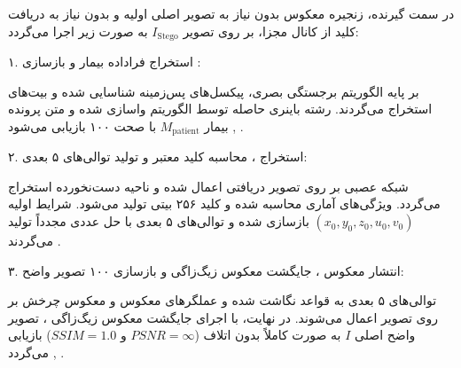 




در سمت گیرنده، زنجیره معکوس بدون نیاز به تصویر اصلی اولیه و بدون نیاز به دریافت کلید از کانال مجزا، بر روی تصویر $I_{\mathrm{Stego}}$ به صورت زیر اجرا می‌گردد:\par



۱. استخراج فراداده بیمار و بازسازی :\par

بر پایه الگوریتم برجستگی بصری، پیکسل‌های پس‌زمینه شناسایی شده و بیت‌های  استخراج می‌گردند. رشته باینری حاصله توسط الگوریتم  واسازی  شده و متن پرونده بیمار $M_{\mathrm{patient}}$ با صحت ۱۰۰ بازیابی می‌شود , .\par



۲. استخراج ، محاسبه کلید معتبر و تولید توالی‌های ۵ بعدی:\par

شبکه عصبی  بر روی تصویر دریافتی اعمال شده و ناحیه دست‌نخورده  استخراج می‌گردد. ویژگی‌های آماری  محاسبه شده و کلید ۲۵۶ بیتی  تولید می‌شود. شرایط اولیه $(x_0,\allowbreak{} y_0,\allowbreak{} z_0,\allowbreak{} u_0,\allowbreak{} v_0)$ بازسازی شده و توالی‌های ۵ بعدی با حل عددی  مجدداً تولید می‌گردند .\par



۳. انتشار معکوس ، جایگشت معکوس زیگ‌زاگی و بازسازی ۱۰۰ تصویر واضح:\par

توالی‌های ۵ بعدی به قواعد  نگاشت شده و عملگرهای معکوس  و معکوس چرخش  بر روی تصویر اعمال می‌شوند. در نهایت، با اجرای جایگشت معکوس زیگ‌زاگی ، تصویر واضح اصلی $I$ به صورت کاملاً بدون اتلاف ($PSNR = \infty$ و $SSIM = 1.0$) بازیابی می‌گردد , .\par

